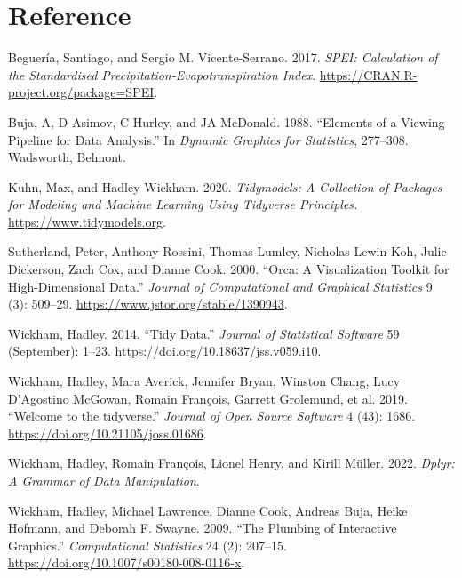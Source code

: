 \documentclass[
]{article}
\newlength{\cslhangindent}
\newlength{\cslentryspacingunit} %
\newenvironment{CSLReferences}[2] %
 {%
  \setlength{\parindent}{0pt}
  \ifodd #1
  \let\oldpar\par
  \def\par{\hangindent=\cslhangindent\oldpar}
  \fi
  \setlength{\parskip}{#2\cslentryspacingunit}
 }%
 {}
\begin{document}
\hypertarget{reference}{%
\section*{Reference}\label{reference}}

\hypertarget{refs}{}
\begin{CSLReferences}{1}{0}
\leavevmode{}%
Beguería, Santiago, and Sergio M. Vicente-Serrano. 2017. \emph{SPEI:
Calculation of the Standardised Precipitation-Evapotranspiration Index}.
\url{https://CRAN.R-project.org/package=SPEI}.

\leavevmode{}%
Buja, A, D Asimov, C Hurley, and JA McDonald. 1988. {``Elements of a
Viewing Pipeline for Data Analysis.''} In \emph{Dynamic Graphics for
Statistics}, 277--308. Wadsworth, Belmont.

\leavevmode{}%
Kuhn, Max, and Hadley Wickham. 2020. \emph{Tidymodels: A Collection of
Packages for Modeling and Machine Learning Using Tidyverse Principles.}
\url{https://www.tidymodels.org}.

\leavevmode{}%
Sutherland, Peter, Anthony Rossini, Thomas Lumley, Nicholas Lewin-Koh,
Julie Dickerson, Zach Cox, and Dianne Cook. 2000. {``Orca: {A}
{Visualization} {Toolkit} for {High}-{Dimensional} {Data}.''}
\emph{Journal of Computational and Graphical Statistics} 9 (3): 509--29.
\url{https://www.jstor.org/stable/1390943}.

\leavevmode{}%
Wickham, Hadley. 2014. {``Tidy {Data}.''} \emph{Journal of Statistical
Software} 59 (September): 1--23.
\url{https://doi.org/10.18637/jss.v059.i10}.

\leavevmode{}%
Wickham, Hadley, Mara Averick, Jennifer Bryan, Winston Chang, Lucy
D'Agostino McGowan, Romain François, Garrett Grolemund, et al. 2019.
{``Welcome to the {tidyverse}.''} \emph{Journal of Open Source Software}
4 (43): 1686. \url{https://doi.org/10.21105/joss.01686}.

\leavevmode{}%
Wickham, Hadley, Romain François, Lionel Henry, and Kirill Müller. 2022.
\emph{Dplyr: A Grammar of Data Manipulation}.

\leavevmode{}%
Wickham, Hadley, Michael Lawrence, Dianne Cook, Andreas Buja, Heike
Hofmann, and Deborah F. Swayne. 2009. {``The Plumbing of Interactive
Graphics.''} \emph{Computational Statistics} 24 (2): 207--15.
\url{https://doi.org/10.1007/s00180-008-0116-x}.

\end{CSLReferences}
\end{document}
